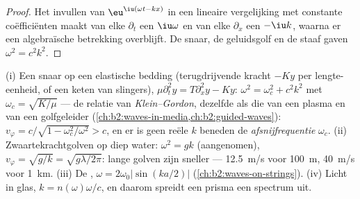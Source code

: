 \begin{proof}
Het invullen van $\eu^{\iu(\omega t - kx)}$ in een lineaire vergelijking met
constante coëfficiënten maakt van elke $\partial_t$ een $\iu\omega$ en van
elke $\partial_x$ een $-\iu k$, waarna er een algebraïsche betrekking
overblijft. De snaar, de geluidsgolf en de staaf gaven $\omega^2 = c^2k^2$.
\end{proof}

\begin{example}\label{ex:b2:dispersion-wave-packets:examples}
(i) Een snaar op een elastische bedding (terugdrijvende kracht $-Ky$ per
lengte-eenheid, of een keten van slingers),
$\mu\partial_t^2y = T\partial_x^2y - Ky$: $\omega^2 = \omega_c^2
+ c^2k^2$
met $\omega_c = \sqrt{K/\mu}$ --- de relatie van \emph{Klein--Gordon},
dezelfde als die van een plasma en van een golfgeleider
(\cref{ch:b2:waves-in-media,ch:b2:guided-waves}):
$v_\varphi = c/\sqrt{1 -
\omega_c^2/\omega^2} > c$, en er is geen reële $k$
beneden de \emph{afsnijfrequentie} $\omega_c$. (ii) Zwaartekrachtgolven op
diep water: $\omega^2 = gk$ (aangenomen),
$v_\varphi =
\sqrt{g/k} = \sqrt{g\lambda/2\pi}$: lange golven zijn sneller
--- \qty{12.5}{m/s} voor \qty{100}{m}, \qty{40}{m/s} voor \qty{1}{km}. (iii)
De , $\omega =
2\omega_0|\sin(ka/2)|$
(\cref{ch:b2:waves-on-strings}). (iv) Licht in glas,
$k = n(\omega)\omega/c$, en daarom spreidt een prisma een spectrum uit.
\end{example}

